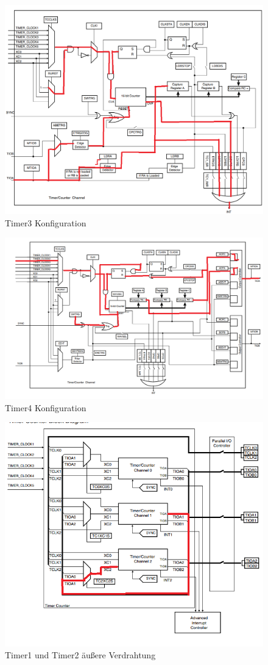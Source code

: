 \documentclass[12pt]{article}
\begin{document}
\begin{figure}
    \includegraphics[width=\textwidth]{Timer3.png}
    \caption{Timer3 Konfiguration}
\end{figure}
\begin{figure}
    \includegraphics[width=\textwidth]{Timer4.png}
    \caption{Timer4 Konfiguration}
\end{figure}
\begin{figure}
    \includegraphics[width=\textwidth]{Timer_Blockschaltbild.png}
    \caption{Timer1 und Timer2 äußere Verdrahtung}
\end{figure}
\end{document}

